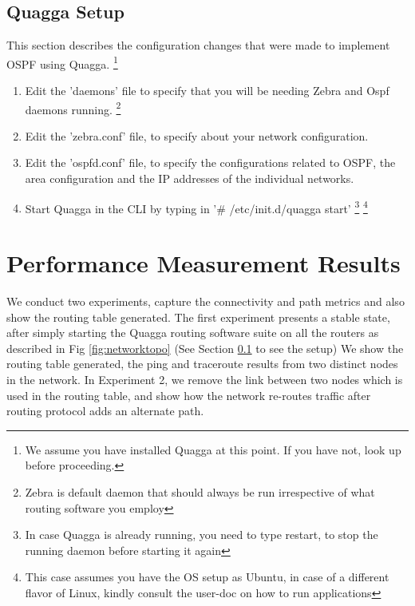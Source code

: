 \documentclass{article}
\begin{document}
\subsection{Quagga Setup}
\label{sec:quaggasetup}
This section describes the configuration changes that were made to implement OSPF using Quagga.
\footnote{We assume you have installed Quagga at this point. If you have not, look up \cite{quaggaubuntuinstall} \cite{quaggainstall} before proceeding.}
\begin{enumerate}
  \item Edit the 'daemons' file to specify that you will be needing Zebra and Ospf daemons running. \footnote{Zebra is default daemon that should always be run
    irrespective of what routing software you employ}
  \item Edit the 'zebra.conf' file, to specify about your network configuration.
  \item Edit the 'ospfd.conf' file, to specify the configurations related to OSPF, the area configuration and the IP addresses of the individual networks.
  \item Start Quagga in the CLI by typing in '\# /etc/init.d/quagga start' 
    \footnote{In case Quagga is already running, you need to type restart, to stop the running daemon before starting it again}
    \footnote{This case assumes you have the OS setup as Ubuntu, in case of a different flavor of Linux, kindly consult the user-doc on how to run applications}
\end{enumerate}
\clearpage
\section{Performance Measurement Results}
We conduct two experiments, capture the connectivity and path metrics and also show the routing table generated.
The first experiment presents a stable state, after simply starting the Quagga routing software suite on all the routers as described in
Fig \ref{fig:networktopo} (See Section \ref{sec:quaggasetup} to see the setup)
We show the routing table generated, the ping and traceroute results from two distinct nodes in the network.
In Experiment 2, we remove the link between two nodes which is used in the routing table, and show how the network re-routes traffic 
after routing protocol adds an alternate path.
\end{document}
